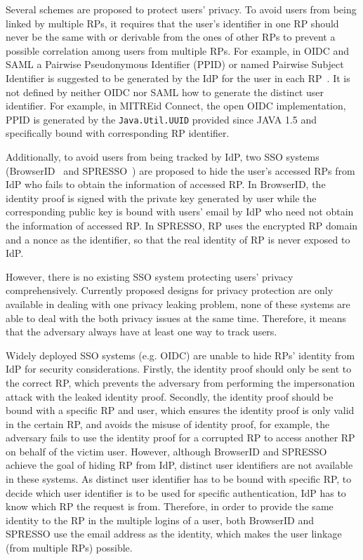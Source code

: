Several schemes are proposed to protect users' privacy. To avoid users from being linked by multiple RPs, it requires that the user's identifier in one RP should never be the same with or derivable from the ones of other RPs to prevent a possible correlation among users from multiple RPs. For example, in OIDC and SAML a Pairwise Pseudonymous Identifier (PPID) or named Pairwise Subject Identifier is suggested to be generated by the IdP for the user in each RP~\cite{OpenIDConnect, SAMLIdentifier}.
It is not defined by neither OIDC nor SAML how to generate the distinct user identifier. For example, in MITREid Connect, the open OIDC implementation, PPID is generated by the \verb+Java.Util.UUID+ provided since JAVA 1.5 and specifically bound with corresponding RP identifier. 

Additionally, to avoid users from being tracked by IdP, two SSO systems (BrowserID~\cite{persona} and SPRESSO~\cite{SPRESSO}) are proposed to hide the user's accessed RPs from IdP who fails to obtain the information of accessed RP. In BrowserID, the identity proof is signed with the private key generated by user while the corresponding  public key is bound with users' email by IdP who need not obtain the information of accessed RP. In SPRESSO, RP uses the encrypted RP domain and a nonce as the identifier, so that the real identity of RP is never exposed to IdP. 

However, 
there is no existing SSO system protecting users' privacy comprehensively. Currently proposed designs for privacy protection are only available in dealing with one privacy leaking problem, none of these systems are able to deal with the both privacy issues at the same time. Therefore, it means that the adversary always have at least one way to track users. 


Widely deployed SSO systems (e.g. OIDC) are unable to hide RPs' identity from IdP for security considerations. Firstly, the identity proof should only be sent to the correct RP, which prevents the adversary from performing the impersonation attack with the leaked identity proof. Secondly, the identity proof should be bound with a specific RP and user, which ensures the identity proof is only valid in the certain RP, and avoids the misuse of identity proof, for example, the adversary fails to  use the identity proof for a corrupted RP to access another RP on behalf of the victim user. However, although BrowserID and SPRESSO achieve the goal of hiding RP from IdP, distinct user identifiers are not available in these systems. As distinct user identifier has to be bound with specific RP, to decide which user identifier is to be used for specific authentication, IdP has to know which RP the request is from. Therefore, in order to provide the same identity to the RP in the multiple logins of a user, both BrowserID and SPRESSO use the email address as the identity, which makes the user linkage (from multiple RPs) possible.


